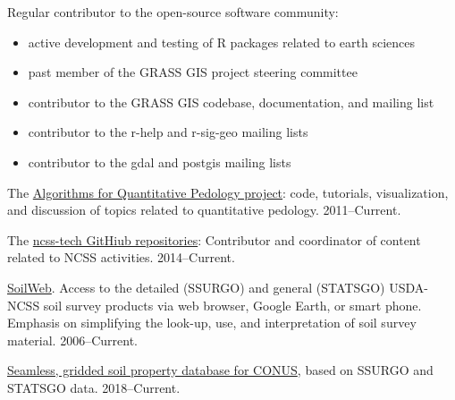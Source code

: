 \documentclass[overlapped,line,10pt,letterpaper]{res}
\begin{document}
\begin{resume}
Regular contributor to the open-source software community:
\begin{itemize}[itemsep=0.05cm]
	\small
	\item active development and testing of R packages related to earth sciences
	\item past member of the GRASS GIS project steering committee
	\item contributor to the GRASS GIS codebase, documentation, and mailing list
	\item contributor to the r-help and r-sig-geo mailing lists
	\item contributor to the gdal and postgis mailing lists
\end{itemize}

The \href{http://ncss-tech.github.io/AQP/}{Algorithms for Quantitative Pedology project}: code, tutorials, visualization, and discussion of topics related to quantitative pedology. 2011--Current.

The \href{https://github.com/ncss-tech/}{ncss-tech GitHiub repositories}: Contributor and coordinator of content related to NCSS activities. 2014--Current.

\href{http://casoilresource.lawr.ucdavis.edu/soilweb}{SoilWeb}. Access to the detailed (SSURGO) and general (STATSGO) USDA-NCSS soil survey products via web browser, Google Earth, or smart phone. Emphasis on simplifying the look-up, use, and interpretation of soil survey material. 2006--Current.

\href{https://casoilresource.lawr.ucdavis.edu/soil-properties/}{Seamless, gridded soil property database for CONUS}, based on SSURGO and STATSGO data. 2018--Current.





\end{resume}
\end{document}
